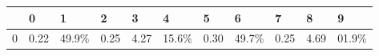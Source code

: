 \begin{tabular}{lllllllllll}
\toprule
{} &     0 &      1 &     2 &     3 &      4 &     5 &      6 &     7 &     8 &      9 \\
\midrule
0 &  0.22 &  49.9\% &  0.25 &  4.27 &  15.6\% &  0.30 &  49.7\% &  0.25 &  4.69 &  01.9\% \\
\bottomrule
\end{tabular}
